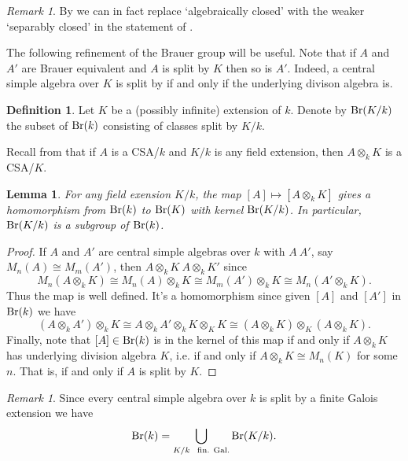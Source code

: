 \documentclass[11pt]{amsart}
\numberwithin{equation}{section}
\newtheorem{lemma}[equation]{Lemma}
\theoremstyle{remark}
\newtheorem{remark}[equation]{Remark}
\theoremstyle{remark}
\theoremstyle{remark}
\theoremstyle{definition}
\theoremstyle{definition}
\theoremstyle{definition}
\newtheorem{defi}[equation]{Definition}
\theoremstyle{definition}
\theoremstyle{definition}
\theoremstyle{definition}
\begin{document}
\begin{remark}
By   we can in fact replace  `algebraically closed' with the weaker `separably closed'  in the statement of .
\end{remark}

The following refinement of the Brauer group will be useful. Note that if $A$ and $A'$ are Brauer equivalent and $A$ is split by $K$ then so is $A'$. Indeed, a central simple algebra over $K$ is split by if and only if the underlying divison algebra is. 

\begin{defi}
Let $K$ be a (possibly infinite) extension of $k$. Denote by $\textup{Br}(K/k)$ the subset of $\textup{Br}(k)$ consisting of classes split by $K/k$.
\end{defi}

Recall from  that if  $A$ is a CSA/$k$ and $K/k$ is any field extension, then $A\otimes_k K$ is a CSA/$K$.

\begin{lemma}
For any field exension $K/k$, the map $[A]\mapsto [A\otimes_k K]$ gives a homomorphism from $\textup{Br}(k)$ to $\textup{Br}(K)$ with kernel  $\textup{Br}(K/k)$. In particular,  $\textup{Br}(K/k)$ is a subgroup of $\textup{Br}(k)$.
\end{lemma}

\begin{proof}
If $A$ and $A'$ are central simple algebras over $k$ with $A~A'$, say $M_n(A)\cong M_m(A')$, then $A\otimes_k K~A\otimes_k K'$ since
\[M_n(A\otimes_k K)\cong M_n(A)\otimes_k K\cong M_m(A')\otimes_k K\cong M_n(A'\otimes_k K).\]
Thus the map is well defined. It's a homomorphism since given $[A]$ and $[A']$ in $\textup{Br}(k)$ we have
\[(A\otimes_k A')\otimes_k K\cong A\otimes_k A'\otimes_k K \otimes_K K\cong (A\otimes_k K)\otimes_K (A\otimes_k K).\]
Finally, note that $[A]\in \textup{Br}(k)$ is in the kernel of this map if and only if $A\otimes_k K$ has underlying division algebra $K$, i.e. if and only if $A\otimes_k K\cong M_n(K)$ for some $n$. That is, if and only if $A$ is split by $K$. 
\end{proof}

\begin{remark} \label{Brauer as union}
Since every central simple algebra over $k$ is split by a finite Galois extension we have
\[\textup{Br}(k)=\bigcup_{K/k~~\textup{fin. Gal.}}\textup{Br}(K/k).\]
\end{remark}
\end{document}
